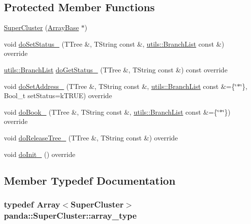 \subsection*{Protected Member Functions}
\begin{DoxyCompactItemize}
\item 
\hyperlink{classpanda_1_1SuperCluster_a07566c266f4073b8045fb5fa3ee2ad17}{SuperCluster} (\hyperlink{classpanda_1_1ArrayBase}{ArrayBase} $\ast$)
\item 
void \hyperlink{classpanda_1_1SuperCluster_ac76b8e67d9f4c276c4cf97a563ef5627}{doSetStatus\_\-} (TTree \&, TString const \&, \hyperlink{classpanda_1_1utils_1_1BranchList}{utils::BranchList} const \&) override
\item 
\hyperlink{classpanda_1_1utils_1_1BranchList}{utils::BranchList} \hyperlink{classpanda_1_1SuperCluster_a6b60a8ad8ccc886281aecdb05e1395fb}{doGetStatus\_\-} (TTree \&, TString const \&) const override
\item 
void \hyperlink{classpanda_1_1SuperCluster_a70ea0eea33b735c6c38414ffaa3e1f15}{doSetAddress\_\-} (TTree \&, TString const \&, \hyperlink{classpanda_1_1utils_1_1BranchList}{utils::BranchList} const \&=\{\char`\"{}$\ast$\char`\"{}\}, Bool\_\-t setStatus=kTRUE) override
\item 
void \hyperlink{classpanda_1_1SuperCluster_a7d3d27e3fcc51d8c0fc8707515280bcd}{doBook\_\-} (TTree \&, TString const \&, \hyperlink{classpanda_1_1utils_1_1BranchList}{utils::BranchList} const \&=\{\char`\"{}$\ast$\char`\"{}\}) override
\item 
void \hyperlink{classpanda_1_1SuperCluster_ac09c224f056ac15319802ccb3a807a2a}{doReleaseTree\_\-} (TTree \&, TString const \&) override
\item 
void \hyperlink{classpanda_1_1SuperCluster_aa8d0935f9067c9ea3abfa9e7cade89ea}{doInit\_\-} () override
\end{DoxyCompactItemize}


\subsection{Member Typedef Documentation}
\hypertarget{classpanda_1_1SuperCluster_a07efcd94dd507a541afe78bdb8e365f9}{
\subsubsection[{array\_\-type}]{\setlength{\rightskip}{0pt plus 5cm}typedef {\bf Array}$<${\bf SuperCluster}$>$ {\bf panda::SuperCluster::array\_\-type}}}
\label{classpanda_1_1SuperCluster_a07efcd94dd507a541afe78bdb8e365f9}


